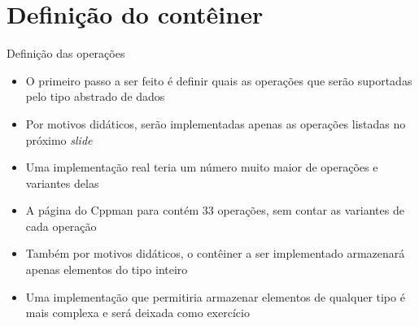 \section{Definição do contêiner}

\begin{frame}[fragile]{Definição das operações}

    \begin{itemize}
        \item O primeiro passo a ser feito é definir quais as operações que serão suportadas
        pelo tipo abstrado de dados

        \item Por motivos didáticos, serão implementadas apenas as operações listadas no 
        próximo \textit{slide}

        \item Uma implementação real teria um número muito maior de operações e variantes delas

        \item A página do Cppman para  contém 33 operações, sem contar as 
        variantes de cada operação

        \item Também por motivos didáticos, o contêiner a ser implementado armazenará apenas
        elementos do tipo inteiro

        \item Uma implementação que permitiria armazenar elementos de qualquer tipo é mais
        complexa e será deixada como exercício
    \end{itemize}

\end{frame}

